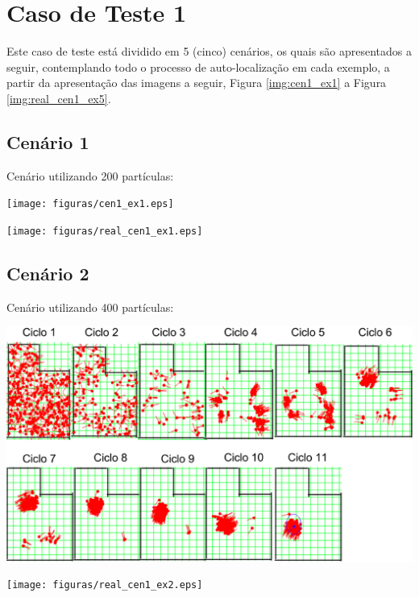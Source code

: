 \section{Caso de Teste 1}
\label{sec:cenario1}

Este caso de teste está dividido em 5 (cinco) cenários, os quais são apresentados a seguir, contemplando todo o processo de auto-localização
em cada exemplo, a partir da apresentação das imagens a seguir, Figura \ref{img:cen1_ex1} a Figura \ref{img:real_cen1_ex5}.

\subsection{Cenário 1}

Cenário utilizando 200 partículas:

{\centering
\texttt{[image: figuras/cen1\_ex1.eps]}
\label{img:cen1_ex1}
\par}

{\centering
\texttt{[image: figuras/real\_cen1\_ex1.eps]}
\label{img:real_cen1_ex1}
\par}

\subsection{Cenário 2}

Cenário utilizando 400 partículas:

{\centering
\includegraphics[scale=0.4]{figuras/cen1_ex2.eps}
\label{img:cen1_ex2}
\par}

{\centering
\texttt{[image: figuras/real\_cen1\_ex2.eps]}
\label{img:real_cen1_ex2}
\par}

